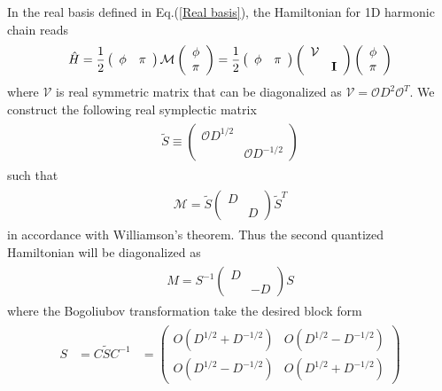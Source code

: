 In the real basis defined in Eq.(\ref{Real basis}), the Hamiltonian for 1D harmonic chain reads
\begin{eqnarray}\begin{aligned}
\hat{H}
=\frac{1}{2}
\left(\begin{array}{ccc}
\phi & \pi
\end{array}\right)
\mathcal{M}
\left(\begin{array}{ccc}
\phi\\
\pi
\end{array}\right)
=\frac{1}{2}
\left(\begin{array}{ccc}
\phi & \pi
\end{array}\right)
\left(\begin{array}{ccc}
\mathcal{V} \\
& {\bf I}
\end{array}\right)
\left(\begin{array}{ccc}
\phi\\
\pi
\end{array}\right)
\end{aligned}\end{eqnarray}
where $\mathcal{V}$ is real symmetric matrix that can be diagonalized as $\mathcal{V}=\mathcal{O}D^2\mathcal{O}^T$. We construct the following real symplectic matrix
\begin{eqnarray}\begin{aligned}
\tilde{S}\equiv\left(\begin{array}{ccc}
\mathcal{O}D^{1/2} \\
& \mathcal{O}D^{-1/2}
\end{array}\right)
\end{aligned}\end{eqnarray}
such that 
\begin{eqnarray}\begin{aligned}
\mathcal{M}=\tilde{S}\left(\begin{array}{ccc}
D \\ 
& D
\end{array}\right)
\tilde{S}^T
\end{aligned}\end{eqnarray}
in accordance with Williamson's theorem. Thus the second quantized Hamiltonian will be diagonalized as
\begin{eqnarray}\begin{aligned}
M=S^{-1}\left(\begin{array}{ccc}
D \\
& -D
\end{array}\right)S
\end{aligned}\end{eqnarray}
where the Bogoliubov transformation take the desired block form
\begin{eqnarray}\begin{aligned}
S&=C\tilde{S}C^{-1}
&=\left(\begin{array}{ccc}
O(D^{1/2}+D^{-1/2}) & O(D^{1/2}-D^{-1/2}) \\
O(D^{1/2}-D^{-1/2}) & O(D^{1/2}+D^{-1/2}) 
\end{array}\right)
\end{aligned}\end{eqnarray}


